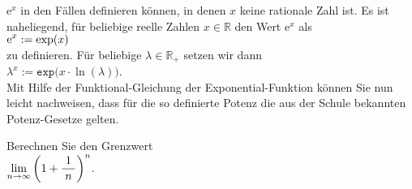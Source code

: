 $\mathrm{e}^x$ in den F\"allen definieren k\"onnen, in denen $x$ keine rationale Zahl ist. 
Es ist naheliegend, f\"ur beliebige reelle Zahlen $x \in \mathbb{R}$ den
Wert $\mathrm{e}^x$ als
\\[0.2cm]
\hspace*{1.3cm}
$\displaystyle \mathrm{e}^x := \exp(x)$
\\[0.2cm]
zu definieren.  F\"ur beliebige $\lambda \in \mathbb{R}_+$ setzen wir dann
\\[0.2cm]
\hspace*{1.3cm}
$\lambda^x := \mathtt{exp}\bigl(x \cdot \ln(\lambda) \bigr)$.
\\[0.2cm]
Mit Hilfe der Funktional-Gleichung der Exponential-Funktion k\"onnen Sie nun leicht nachweisen, dass
f\"ur die so definierte Potenz die aus der Schule bekannten Potenz-Gesetze gelten. \eox

\exercise
Berechnen Sie den Grenzwert
\\[0.2cm]
\hspace*{1.3cm}
$\displaystyle\lim\limits_{n\rightarrow\infty} \left(1 + \frac{1}{\;n\;}\right)^n$.  \eox


